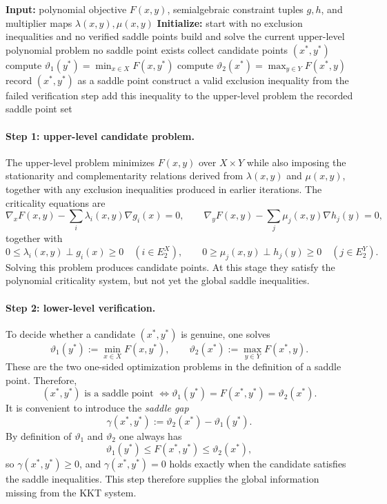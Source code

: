 \documentclass[11pt]{article}
\begin{document}
\begingroup
\begin{algorithmic}[1]
\State \textbf{Input:} polynomial objective $F(x,y)$, semialgebraic constraint tuples $g,h$, and multiplier maps $\lambda(x,y),\mu(x,y)$
\State \textbf{Initialize:} start with no exclusion inequalities and no verified saddle points
\Loop
    \State build and solve the current upper-level polynomial problem
        \State \Return no saddle point exists
    \EndIf
    \State collect candidate points $(x^\ast,y^\ast)$
        \State compute $\vartheta_1(y^\ast)=\min_{x\in X}F(x,y^\ast)$
        \State compute $\vartheta_2(x^\ast)=\max_{y\in Y}F(x^\ast,y)$
            \State record $(x^\ast,y^\ast)$ as a saddle point
        \Else
            \State construct a valid exclusion inequality from the failed verification step
            \State add this inequality to the upper-level problem
        \EndIf
    \EndFor
        \State \Return the recorded saddle point set
    \EndIf
\EndLoop
\end{algorithmic}
\endgroup

\paragraph{Step 1: upper-level candidate problem.}
The upper-level problem minimizes $F(x,y)$ over $X\times Y$ while also imposing the stationarity and complementarity relations derived from $\lambda(x,y)$ and $\mu(x,y)$, together with any exclusion inequalities produced in earlier iterations. The criticality equations are
\[
\nabla_x F(x,y)-\sum_i \lambda_i(x,y)\nabla g_i(x)=0,
\qquad
\nabla_y F(x,y)-\sum_j \mu_j(x,y)\nabla h_j(y)=0,
\]
together with
\[
0\leq \lambda_i(x,y)\perp g_i(x)\geq 0 \quad (i\in E_2^X), \qquad
0\geq \mu_j(x,y)\perp h_j(y)\geq 0 \quad (j\in E_2^Y).
\]
Solving this problem produces candidate points. At this stage they satisfy the polynomial
criticality system, but not yet the global saddle inequalities.

\paragraph{Step 2: lower-level verification.}
To decide whether a candidate $(x^\ast,y^\ast)$ is genuine, one solves
\[
\vartheta_1(y^\ast):=\min_{x \in X} F(x,y^\ast),
\qquad
\vartheta_2(x^\ast):=\max_{y \in Y} F(x^\ast,y).
\]
These are the two one-sided optimization problems in the definition of a saddle point. Therefore,
\[
(x^\ast,y^\ast)\text{ is a saddle point }
\Longleftrightarrow
\vartheta_1(y^\ast)=F(x^\ast,y^\ast)=\vartheta_2(x^\ast).
\]
It is convenient to introduce the \emph{saddle gap}
\[
\gamma(x^\ast,y^\ast):=\vartheta_2(x^\ast)-\vartheta_1(y^\ast).
\]
By definition of $\vartheta_1$ and $\vartheta_2$ one always has
\[
\vartheta_1(y^\ast)\leq F(x^\ast,y^\ast)\leq \vartheta_2(x^\ast),
\]
so $\gamma(x^\ast,y^\ast)\geq 0$, and $\gamma(x^\ast,y^\ast)=0$ holds exactly when the candidate
satisfies the saddle inequalities. This step therefore supplies the global information missing from
the KKT system.
\end{document}
